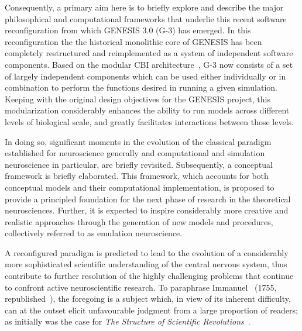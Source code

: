 \documentclass[11pt,3p,twocolumn]{JMN}
\begin{document}
Consequently, a primary aim here is to briefly explore and describe the major philosophical and computational frameworks that underlie this recent software reconfiguration from which GENESIS 3.0 (G-3) has emerged. In this reconfiguration the the historical monolithic core of GENESIS has been completely restructured and reimplemented as a system of independent software components. Based on the modular CBI architecture~\citep{cornelis12}, G-3 now consists of a set of largely independent components which can be used either individually or in combination to perform the functions desired in running a given simulation. Keeping with the original design objectives for the GENESIS project, this modularization considerably enhances the ability to run models across different levels of biological scale, and greatly facilitates interactions between those levels.

In doing so, significant moments in the evolution of the classical paradigm established for neuroscience generally and computational and simulation neuroscience in particular, are briefly revisited. Subsequently, a conceptual framework is briefly elaborated. This framework, which accounts for both conceptual models and their computational implementation, is proposed to provide a principled foundation for the next phase of research in the theoretical neurosciences. Further, it is expected to inspire considerably more creative and realistic approaches through the generation of new models and procedures, collectively referred to as emulation neuroscience.

A reconfigured paradigm is predicted to lead to the evolution of a considerably more sophisticated scientific understanding of the central nervous system, thus contribute to further resolution of the highly challenging problems that continue to confront active neuroscientific research. To paraphrase Immanuel~\citeauthor{kant08} (1755, republished~\citeyear{kant08}), the foregoing is a subject which, in view of its inherent difficulty, can at the outset elicit unfavourable judgment from a large proportion of readers; as initially was the case for {\it The Structure of Scientific Revolutions}~\citep[][see also~\citeauthor{mahfoud21}~\citeyear{mahfoud21}]{bird22}.

\end{document}
